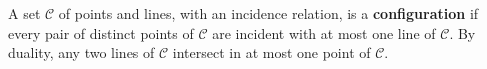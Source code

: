 A set $\mathcal{C}$ of points and lines, with an incidence relation, is a \textbf{configuration} if every pair of distinct points of $\mathcal{C}$ are incident with at most one line of $\mathcal{C}$. By duality, any two lines of $\mathcal{C}$ intersect in at most one point of $\mathcal{C}$.
